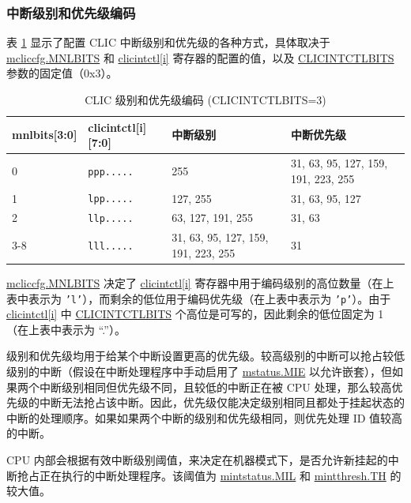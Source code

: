 \documentclass[main\_\_CN.tex]{subfiles}
\begin{document}
\hypertarget{riscvcpu-clic-int-level-prio}{}
 \subsubsection{中断级别和优先级编码}
\label{sec:riscvcpu-clic-int-level-prio}

表 \ref{tab:riscv-clic-level-priority} 显示了配置 CLIC 中断级别和优先级的各种方式，具体取决于 \hyperref[fielddesc:MCLICCFG_MNLBITS]{mcliccfg.MNLBITS} 和 \hyperref[regdesc:MCLICINTCTL_REG_i]{clicintctl[i]} 寄存器的配置的值，以及 \hyperref[fielddesc:CLICINFO_CLICINTCTLBITS]{CLICINTCTLBITS} 参数的固定值（0x3）。

\begin{longtable}{ | l | l | l | l | }
\caption{CLIC 级别和优先级编码 (CLICINTCTLBITS=3)}
\label{tab:riscv-clic-level-priority}
\\\hline
\rowcolor{lightgray}
mnlbits[3:0] & clicintctl[i][7:0] & 中断级别 & 中断优先级 \\ \hline
0   & \texttt{ppp.....} & 255 & 31, 63, 95, 127, 159, 191, 223, 255 \\ \hline
1   & \texttt{lpp.....} & 127, 255 & 31, 63, 95, 127 \\ \hline
2   & \texttt{llp.....} & 63, 127, 191, 255 & 31, 63 \\ \hline
3-8 & \texttt{lll.....} & 31, 63, 95, 127, 159, 191, 223, 255 & 31 \\ \hline
\end{longtable}

\hyperref[fielddesc:MCLICCFG_MNLBITS]{mcliccfg.MNLBITS} 决定了 \hyperref[regdesc:MCLICINTCTL_REG_i]{clicintctl[i]} 寄存器中用于编码级别的高位数量（在上表中表示为 \texttt{'l'}），而剩余的低位用于编码优先级（在上表中表示为 \texttt{'p'}）。由于 \hyperref[regdesc:MCLICINTCTL_REG_i]{clicintctl[i]} 中 \hyperref[fielddesc:CLICINFO_CLICINTCTLBITS]{CLICINTCTLBITS} 个高位是可写的，因此剩余的低位固定为 1（在上表中表示为 ``.”）。

级别和优先级均用于给某个中断设置更高的优先级。较高级别的中断可以抢占较低级别的中断（假设在中断处理程序中手动启用了 \hyperref[fielddesc:MSTATUSMIE]{mstatus.MIE} 以允许嵌套），但如果两个中断级别相同但优先级不同，且较低的中断正在被 CPU 处理，那么较高优先级的中断无法抢占该中断。因此，优先级仅能决定级别相同且都处于挂起状态的中断的处理顺序。如果如果两个中断的级别和优先级相同，则优先处理 ID 值较高的中断。


CPU 内部会根据有效中断级别阈值，来决定在机器模式下，是否允许新挂起的中断抢占正在执行的中断处理程序。该阈值为 \hyperref[fielddesc:MINTSTATUS_MIL]{{mintstatus.MIL}} 和 \hyperref[fielddesc:MINTTHRESH_TH]{{mintthresh.TH}} 的较大值。
\end{document}
